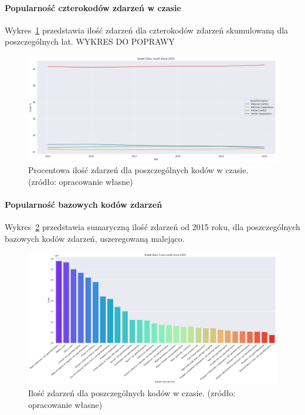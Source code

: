 \documentclass[11pt]{report}
\begin{document}
    \paragraph{Popularność czterokodów zdarzeń w czasie}
    Wykres~\ref{fig:GLOBALQCperc} przedstawia ilość zdarzeń dla czterokodów zdarzeń skumulowaną dla poszczególnych lat.
    WYKRES DO POPRAWY
    \begin{figure}[ht]
        \centering
        \includegraphics[width=1 \textwidth]{fig/GLOBAL/QCperc.png}
        \caption{Procentowa ilość zdarzeń dla poszczególnych kodów w czasie. (zródło: opracowanie własne)}
        \label{fig:GLOBALQCperc}
    \end{figure}

    \paragraph{Popularność bazowych kodów zdarzeń}
    Wykres~\ref{fig:GLOBALEBC} przedstawia sumaryczną ilość zdarzeń od 2015 roku, dla poszczególnych bazowych kodów zdarzeń, uszeregowaną malejąco.
    \begin{figure}[ht]
        \centering
        \includegraphics[width=1 \textwidth]{fig/GLOBAL/EBC.png}
        \caption{Ilość zdarzeń dla poszczególnych kodów w czasie. (zródło: opracowanie własne)}
        \label{fig:GLOBALEBC}
    \end{figure}
\end{document}
